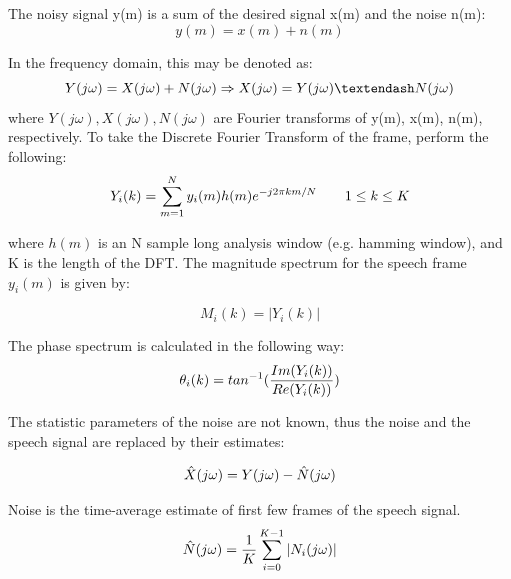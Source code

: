 The noisy signal y(m) is a sum of the desired signal x(m) and the noise n(m):
\begin{equation}
y(m) = x(m) + n(m)
\end{equation}

In the frequency domain, this may be denoted as:
\begin{equation}
Y(j\omega) = X(j\omega) + N(j\omega) \Rightarrow X(j\omega) = Y(j\omega) – N(j\omega)\\
\end{equation}
where $Y(j\omega), X(j\omega), N(j\omega)$ are Fourier transforms of y(m), x(m), n(m), respectively.
To take the Discrete Fourier Transform of the frame, perform the following:
\begin{equation}
Y_i(k) =
\sum_{m=1}^{N}
y_i(m)h(m)e^{-j2\pi km/N} \qquad 1\leq k\leq K\\
\end{equation}

where $h(m)$ is an N sample long analysis window (e.g. hamming window), and K is the length of the DFT. The magnitude spectrum for the speech frame $y_i(m)$ is given by:

\begin{equation}
M_{i}(k) = | Y_{i}(k) |
\end{equation}

The phase spectrum is calculated in the following way:
\begin{equation}
\theta_i(k) = tan^{-1}(\frac{Im(Y_i(k))}{Re(Y_i(k))}) \\
\end{equation}


The statistic parameters of the noise are not known, thus the noise and the speech signal are replaced by their estimates:

\begin{equation}
\hat{X}(j\omega) = Y(j\omega) - \hat{N}(j\omega)\\
\end{equation}

Noise is the time-average estimate of first few frames of the speech signal.
\begin{equation}
\hat{N}(j\omega) = \frac{1}{K}  \sum_{i=0}^{K-1}|N_i(j\omega)| \\
\end{equation}

